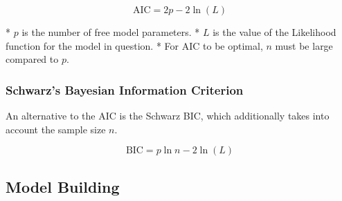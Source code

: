 
\[\mbox{AIC} = 2p - 2\ln(L)\]


*  $p$ is the number of free model parameters.
*  $L$ is the value of the Likelihood function for the model in question.
*  For AIC to be optimal, $n$ must be large compared to $p$.\\

\subsubsection*{Schwarz's Bayesian Information Criterion}
An alternative to the AIC is the Schwarz BIC, which additionally takes into account the sample size $n$.

\[\mbox{BIC} = p\ln{n} - 2\ln(L)\]



%
%
%
%
%
%




\subsection*{Model Building}

